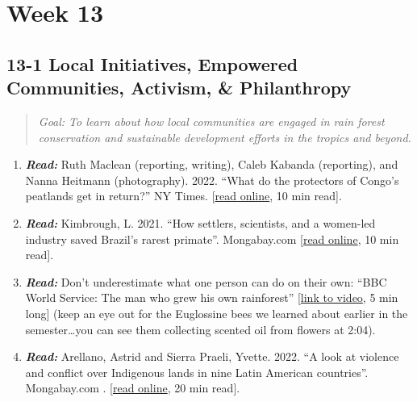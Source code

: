 \documentclass[
  10pt,
  letterpaper,
  oneside,
  open=any]{scrbook}
\begin{document}
\section{Week 13}\label{week-13}

\subsection*{13-1 Local Initiatives, Empowered Communities, Activism, \&
Philanthropy}\label{local-initiatives-empowered-communities-activism-philanthropy}

\begin{quote}
\emph{Goal: To learn about how local communities are engaged in rain
forest conservation and sustainable development efforts in the tropics
and beyond.}
\end{quote}

\begin{enumerate}
\def\labelenumi{\arabic{enumi}.}
\item
  \textbf{\emph{Read:}} Ruth Maclean (reporting, writing), Caleb Kabanda
  (reporting), and Nanna Heitmann (photography). 2022. ``What do the
  protectors of Congo's peatlands get in return?'' NY Times.
  {[}\href{https://www.nytimes.com/interactive/2022/02/21/headway/peatlands-congo-climate-change.html}{read
  online}, 10 min read{]}.
\item
  \textbf{\emph{Read:}} Kimbrough, L. 2021. ``How settlers, scientists,
  and a women-led industry saved Brazil's rarest primate''. Mongabay.com
  {[}\href{https://news.mongabay.com/2021/05/how-settlers-scientists-and-a-women-led-industry-saved-brazils-rarest-primate/}{read
  online}, 10 min read{]}.
\item
  \textbf{\emph{Read:}} Don't underestimate what one person can do on
  their own: ``BBC World Service: The man who grew his own rainforest''
  {[}\href{https://www.youtube.com/watch?v=AngaeIf78AQ}{link to video},
  5 min long{]} (keep an eye out for the Euglossine bees we learned
  about earlier in the semester\ldots you can see them collecting
  scented oil from flowers at 2:04).
\item
  \textbf{\emph{Read:}} Arellano, Astrid and Sierra Praeli, Yvette.
  2022. ``A look at violence and conflict over Indigenous lands in nine
  Latin American countries''. Mongabay.com .
  {[}\href{https://news.mongabay.com/2022/05/a-look-at-violence-and-conflict-over-indigenous-lands-in-nine-latin-american-countries/?utm_medium=Social&utm_source=Twitter\#Echobox=1654027741-1}{read
  online}, 20 min read{]}.
\end{enumerate}
\end{document}
